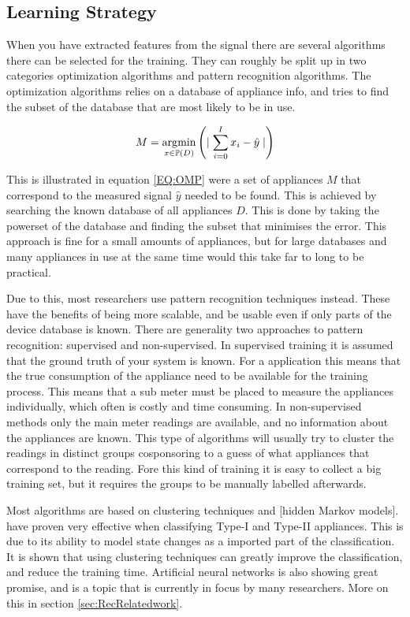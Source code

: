\subsection{Learning Strategy} 
When you have extracted features from the signal there are several algorithms there can be selected for the training. They can roughly be split up in two categories optimization algorithms and pattern recognition algorithms. The optimization algorithms relies on a database of appliance info, and tries to find the subset of the database that are most likely to be in use. 

\begin{equation}
	M = \operatorname*{\arg\!\min}_{x \in \mathbb{P}(D) } \left( \mid {\sum_{i = 0}^{I} x_i - \hat{y}  \mid} \right)
	\label{EQ:OMP}
\end{equation}

This is illustrated in equation \ref{EQ:OMP} were a set of appliances $M$ that correspond to the measured signal $\hat{y}$ needed to be found. This is achieved by searching the known database of all appliances $D$. This is done by taking the powerset of the database and finding the subset that minimises the error. This approach is fine for a small amounts of appliances, but for large databases and many appliances in use at the same time would this take far to long to be practical. 

Due to this, most researchers use pattern recognition techniques instead. These have the benefits of being more scalable, and be usable even if only parts of the device database is known. There are generality two approaches to pattern recognition: supervised and non-supervised. In supervised training it is assumed that the ground truth of your system is known. For a  application this means that the true consumption of the appliance need to be available for the training process. This means that a sub meter must be placed to measure the appliances individually, which often is costly and time consuming. In non-supervised methods only the main meter readings are available, and no information about the appliances are known. This type of algorithms will usually try to cluster the readings in distinct groups cosponsoring to a guess of what appliances that correspond to the reading. Fore this kind of training it is easy to collect a big training set, but it requires the groups to be manually labelled afterwards.  
  
Most algorithms are based on clustering techniques and [hidden Markov models].  have proven very effective when classifying Type-I and Type-II appliances. This is due to its ability to model state changes as a imported part of the classification. It is shown that using clustering techniques can greatly improve the classification, and reduce the training time. Artificial neural networks is also showing great promise, and is a topic that is currently in focus by many  researchers. More on this in section \ref{sec:RecRelatedwork}. 

